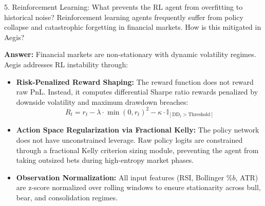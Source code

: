 \documentclass[11pt,a4paper]{article}
\begin{document}
\begin{questionbox}{5. Reinforcement Learning: What prevents the RL agent from overfitting to historical noise?}
Reinforcement learning agents frequently suffer from policy collapse and catastrophic forgetting in financial markets. How is this mitigated in Aegis?
\end{questionbox}
\begin{answerbox}
\textbf{Answer:} Financial markets are non-stationary with dynamic volatility regimes. Aegis addresses RL instability through:
\begin{itemize}[leftmargin=1.5em]
  \item \textbf{Risk-Penalized Reward Shaping:} The reward function does not reward raw PnL. Instead, it computes differential Sharpe ratio rewards penalized by downside volatility and maximum drawdown breaches:
  $$R_t = r_t - \lambda \cdot \min(0, r_t)^2 - \kappa \cdot \mathbb{I}_{[\text{DD}_t > \text{Threshold}]}$$
  \item \textbf{Action Space Regularization via Fractional Kelly:} The policy network does not have unconstrained leverage. Raw policy logits are constrained through a fractional Kelly criterion sizing module, preventing the agent from taking outsized bets during high-entropy market phases.
  \item \textbf{Observation Normalization:} All input features (RSI, Bollinger $\%b$, ATR) are z-score normalized over rolling windows to ensure stationarity across bull, bear, and consolidation regimes.
\end{itemize}
\end{answerbox}

\vspace{0.4em}
\end{document}
